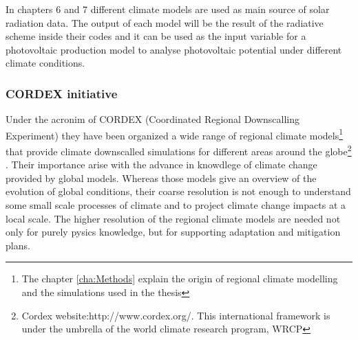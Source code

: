 



In chapters 6 and 7 different climate models are used as main source of solar radiation data. The output of each model will be the result of the radiative scheme inside their codes and it can be used as the input variable for a photovoltaic production model to analyse photovoltaic potential under different climate conditions.

\subsubsection{CORDEX initiative}

Under the acronim of CORDEX (Coordinated Regional Downscalling Experiment) they have been organized a wide range of regional climate models\footnote{The chapter \ref{cha:Methods} explain the origin of regional climate modelling and the simulations used in the thesis} that provide climate downscalled simulations for different areas around the globe\footnote{Cordex website:http://www.cordex.org/. This international framework is under the umbrella of the world climate research program, WRCP} . Their importance arise with the advance in knowdlege of climate change provided by global models. Whereas those models give an overview of the evolution of global conditions, their coarse resolution is not enough to understand some small scale processes of climate and to project climate change impacts at a local scale. The higher resolution of the regional climate models are needed not only for purely pysics knowledge, but for supporting adaptation and mitigation plans.

